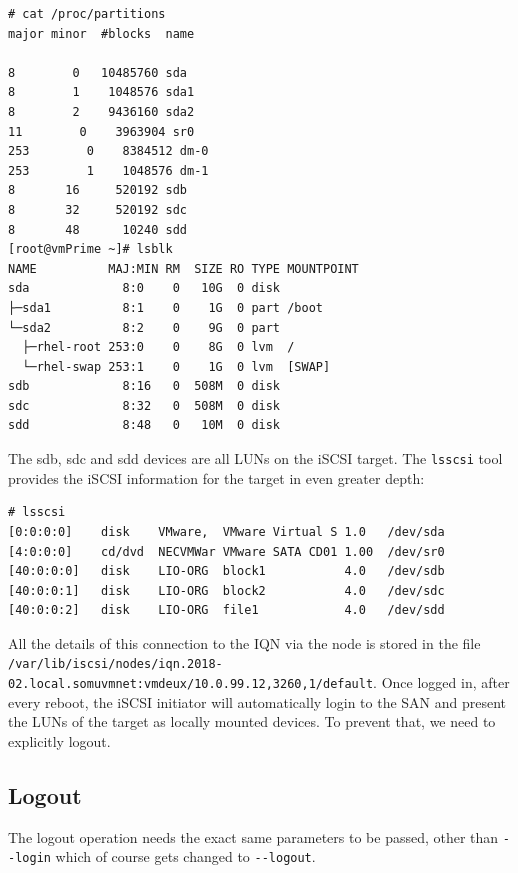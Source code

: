 \vspace{-15pt}
\begin{verbatim}
# cat /proc/partitions
major minor  #blocks  name

8        0   10485760 sda
8        1    1048576 sda1
8        2    9436160 sda2
11        0    3963904 sr0
253        0    8384512 dm-0
253        1    1048576 dm-1
8       16     520192 sdb
8       32     520192 sdc
8       48      10240 sdd
[root@vmPrime ~]# lsblk
NAME          MAJ:MIN RM  SIZE RO TYPE MOUNTPOINT
sda             8:0    0   10G  0 disk 
├─sda1          8:1    0    1G  0 part /boot
└─sda2          8:2    0    9G  0 part 
  ├─rhel-root 253:0    0    8G  0 lvm  /
  └─rhel-swap 253:1    0    1G  0 lvm  [SWAP]
sdb             8:16   0  508M  0 disk 
sdc             8:32   0  508M  0 disk 
sdd             8:48   0   10M  0 disk 
\end{verbatim}
\vspace{-10pt}	

\noindent
The sdb, sdc and sdd devices are all LUNs on the iSCSI target. The \verb|lsscsi| tool provides the iSCSI information for the target in even greater depth:

\vspace{-15pt}
\begin{verbatim}
# lsscsi
[0:0:0:0]    disk    VMware,  VMware Virtual S 1.0   /dev/sda 
[4:0:0:0]    cd/dvd  NECVMWar VMware SATA CD01 1.00  /dev/sr0 
[40:0:0:0]   disk    LIO-ORG  block1           4.0   /dev/sdb 
[40:0:0:1]   disk    LIO-ORG  block2           4.0   /dev/sdc 
[40:0:0:2]   disk    LIO-ORG  file1            4.0   /dev/sdd 
\end{verbatim}
\vspace{-10pt}	

\noindent
All the details of this connection to the IQN via the node is stored in the file \\\verb|/var/lib/iscsi/nodes/iqn.2018-02.local.somuvmnet:vmdeux/10.0.99.12,3260,1/default|. Once logged in, after every reboot, the iSCSI initiator will automatically login to the SAN and present the LUNs of the target as locally mounted devices. To prevent that, we need to explicitly logout.

\subsection{Logout}
The logout operation needs the exact same parameters to be passed, other than \verb|--login| which of course gets changed to \verb|--logout|. 

